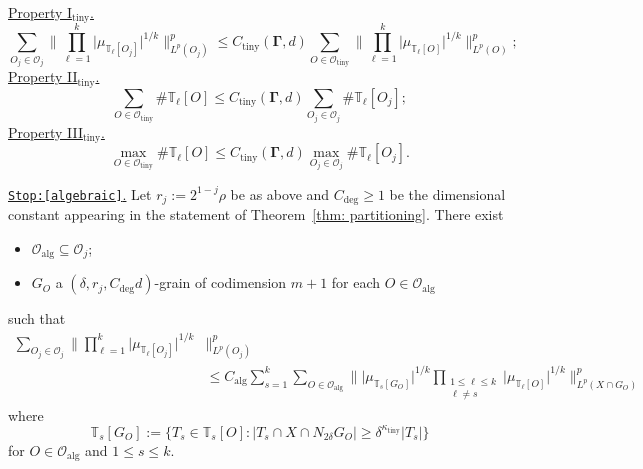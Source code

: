 \documentclass[reqno]{amsart}
\numberwithin{equation}{section}
\newcommand{\T}{\mathbb{T}}
\newcommand{\cO}{\mathcal{O}}
\newcommand{\bdGamma}{\boldsymbol{\Gamma}}
\theoremstyle{plain}
\theoremstyle{definition}
\newcommand{\ttiny}{\mathrm{tiny}}
\newcommand{\alg}{\mathrm{alg}}
\begin{document}
\noindent \underline{Property I$_{\ttiny}$.}
    \begin{equation*}
        \sum_{O_{j} \in \cO_{j}} \Big\|\prod_{\ell = 1}^k \big| \mu_{\T_{\ell}[O_j]} \big|^{1/k}\Big\|_{L^p(O_j)}^p \leq C_{\ttiny}(\bdGamma, d) \sum_{O \in \cO_{\ttiny}} \Big\|\prod_{\ell = 1}^k \big| \mu_{\T_{\ell}[O]}  \big|^{1/k}\Big\|_{L^p(O)}^p;
    \end{equation*}
\noindent \underline{Property II$_{\ttiny}$.}
    \begin{equation*}
        \sum_{O \in \cO_{\ttiny}} \#\T_{\ell}[O] \leq C_{\ttiny}(\bdGamma, d)  \sum_{O_{j} \in \cO_{j}} \# \T_{\ell}[O_j];
    \end{equation*}
\noindent \underline{Property III$_{\ttiny}$.}
    \begin{equation*}
         \max_{O \in \cO_{\ttiny}} \#\T_{\ell}[O]  \leq C_{\ttiny}(\bdGamma, d)\max_{O_{j} \in \cO_{j}} \# \T_{\ell}[O_j].
    \end{equation*}

\noindent \underline{\texttt{Stop:[algebraic]}.} Let $r_j := 2^{1-j} \rho$ be as above and $C_{\deg} \geq 1$ be the dimensional constant appearing in the statement of Theorem~\ref{thm: partitioning}. There exist
\begin{itemize}
    \item $\cO_{\alg} \subseteq \cO_j$;
    \item $G_O$ a $(\delta, r_j, C_{\deg} d)$-grain of codimension $m+1$ for each $O \in \cO_{\alg}$
\end{itemize}
such that 
\begin{align}
\label{eq: stop alg}
    \sum_{O_{j} \in \cO_{j}} \Big\|\prod_{\ell = 1}^k  \big| \mu_{\T_{\ell}[O_j]} \big|^{1/k}&\Big\|_{L^p(O_j)}^p\\
\nonumber
&  \leq C_{\alg} \sum_{s = 1}^k \sum_{O \in \cO_{\alg}} \Big\|\big| \mu_{\T_s[G_O]}  \big|^{1/k}\prod_{\substack{1 \leq \ell  \leq k\\ \ell \neq s}}\big| \mu_{\T_{\ell}[O]} \big|^{1/k}\Big\|_{L^p(X \cap G_O)}^p
\end{align}
where 
\begin{equation}\label{eq: alg tubes}
    \T_s[G_O] := \Big\{ T_s \in \T_s[O] : |T_s \cap X \cap N_{2\delta}G_O| \geq \delta^{\kappa_{\ttiny}} |T_s| \Big\}
\end{equation}
for $O \in \cO_{\alg}$ and $1 \leq s \leq k$. \medskip

%
%
%
\end{document}

